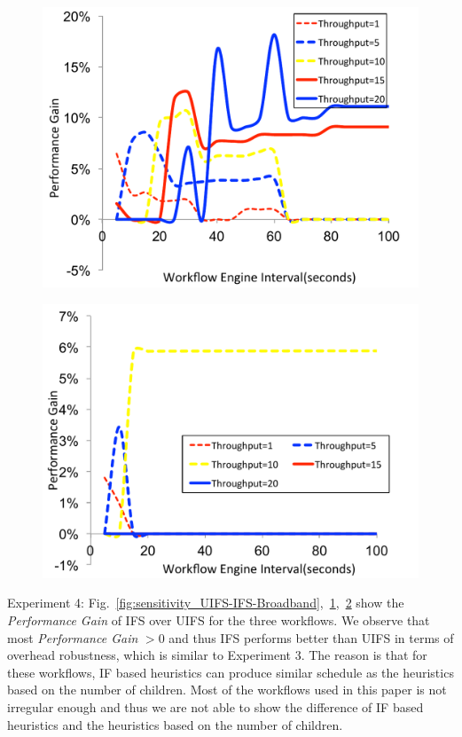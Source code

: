 \begin{figure}[!htb]
\centering
 \includegraphics[width=0.9\linewidth]{figures/sensitivity/UIFS-IFS-CyberShake.pdf}
  \label{fig:sensitivity_UIFS-IFS-CyberShake}
\end{figure}

\begin{figure}[!htb]
\centering
 \includegraphics[width=0.9\linewidth]{figures/sensitivity/UIFS-IFS-Montage.pdf}
  \label{fig:sensitivity_UIFS-IFS-Montage}
\end{figure}
Experiment 4: Fig.~\ref{fig:sensitivity_UIFS-IFS-Broadband},~\ref{fig:sensitivity_UIFS-IFS-CyberShake},~\ref{fig:sensitivity_UIFS-IFS-Montage} show the \emph{Performance Gain} of IFS over UIFS for the three workflows. We observe that most  \emph{Performance Gain} $>0$ and thus IFS performs better than UIFS in terms of overhead robustness, which is similar to Experiment 3. The reason is that for these workflows, IF based heuristics can produce similar schedule as the heuristics based on the number of children. Most of the workflows used in this paper is not irregular enough and thus we are not able to show the difference of IF based heuristics and the heuristics based on the number of children. 

